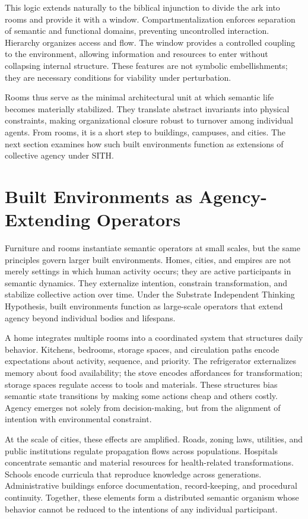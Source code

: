 \documentclass[11pt,oneside]{article}
\begin{document}
This logic extends naturally to the biblical injunction to divide the ark into rooms and provide it with a window. Compartmentalization enforces separation of semantic and functional domains, preventing uncontrolled interaction. Hierarchy organizes access and flow. The window provides a controlled coupling to the environment, allowing information and resources to enter without collapsing internal structure. These features are not symbolic embellishments; they are necessary conditions for viability under perturbation.

Rooms thus serve as the minimal architectural unit at which semantic life becomes materially stabilized. They translate abstract invariants into physical constraints, making organizational closure robust to turnover among individual agents. From rooms, it is a short step to buildings, campuses, and cities. The next section examines how such built environments function as extensions of collective agency under SITH.


\section{Built Environments as Agency-Extending Operators} 

Furniture and rooms instantiate semantic operators at small scales, but the same principles govern larger built environments. Homes, cities, and empires are not merely settings in which human activity occurs; they are active participants in semantic dynamics. They externalize intention, constrain transformation, and stabilize collective action over time. Under the Substrate Independent Thinking Hypothesis, built environments function as large-scale operators that extend agency beyond individual bodies and lifespans.

A home integrates multiple rooms into a coordinated system that structures daily behavior. Kitchens, bedrooms, storage spaces, and circulation paths encode expectations about activity, sequence, and priority. The refrigerator externalizes memory about food availability; the stove encodes affordances for transformation; storage spaces regulate access to tools and materials. These structures bias semantic state transitions by making some actions cheap and others costly. Agency emerges not solely from decision-making, but from the alignment of intention with environmental constraint.

At the scale of cities, these effects are amplified. Roads, zoning laws, utilities, and public institutions regulate propagation flows across populations. Hospitals concentrate semantic and material resources for health-related transformations. Schools encode curricula that reproduce knowledge across generations. Administrative buildings enforce documentation, record-keeping, and procedural continuity. Together, these elements form a distributed semantic organism whose behavior cannot be reduced to the intentions of any individual participant.
\end{document}
